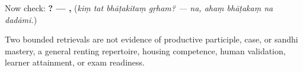 \begin{grammarlens}[title={What you've built: check after answering}]
Now check: \textbf{   ? — ,    } (\emph{kiṃ tat bhāṭakitaṃ gṛham? — na, ahaṃ bhāṭakaṃ na dadāmi.})
\end{grammarlens}

\begin{tcolorbox}[breakable,colback=teal!4,colframe=teal!35!black,title={Before you move on}]
Two bounded retrievals are not evidence of productive participle, case, or sandhi mastery, a general renting repertoire, housing competence, human validation, learner attainment, or exam readiness.
\end{tcolorbox}
